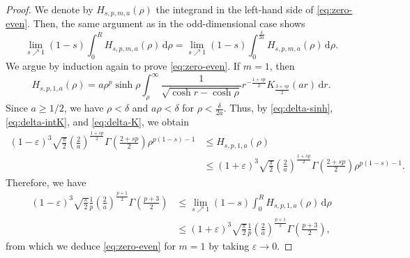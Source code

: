 \documentclass[11pt]{amsart}
\theoremstyle{plain}
\theoremstyle{definition}
\numberwithin{equation}{section}
\begin{document}
\begin{proof}
We denote by $H_{s, p, m, a}(\rho)$ the integrand in the left-hand side of \eqref{eq:zero-even}. Then, the same argument as in the odd-dimensional case shows
\begin{equation*}
\lim_{s \nearrow 1} (1-s) \int_{0}^{R} H_{s, p, m, a}(\rho) \, \mathrm{d}\rho = \lim_{s \nearrow 1} (1-s) \int_{0}^{\frac{\delta}{2a}} H_{s, p, m, a}(\rho) \, \mathrm{d}\rho.
\end{equation*}
We argue by induction again to prove \eqref{eq:zero-even}. If $m=1$, then
\begin{equation*}
H_{s, p, 1, a}(\rho) = a \rho^{p} \sinh\rho \int_{\rho}^{\infty} \frac{1}{\sqrt{\cosh r - \cosh \rho}} r^{-\frac{1+sp}{2}} K_{\frac{3+sp}{2}}(ar) \, \mathrm{d}r.
\end{equation*}
Since $a \geq 1/2$, we have $\rho < \delta$ and $a\rho < \delta$ for $\rho < \frac{\delta}{2a}$. Thus, by \eqref{eq:delta-sinh}, \eqref{eq:delta-intK}, and \eqref{eq:delta-K}, we obtain
\begin{equation*}
\begin{split}
(1-\varepsilon)^{3} \sqrt{\frac{\pi}{2}} \left( \frac{2}{a} \right)^{\frac{1+sp}{2}} \Gamma\left( \frac{2+sp}{2} \right) \rho^{p(1-s)-1}
&\leq H_{s, p, 1, a}(\rho) \\
&\leq (1+\varepsilon)^{3} \sqrt{\frac{\pi}{2}} \left( \frac{2}{a} \right)^{\frac{1+sp}{2}} \Gamma\left( \frac{2+sp}{2} \right) \rho^{p(1-s)-1}.
\end{split}
\end{equation*}
Therefore, we have
\begin{equation*}
\begin{split}
(1-\varepsilon)^{3} \sqrt{\frac{\pi}{2}} \frac{1}{p} \left( \frac{2}{a} \right)^{\frac{p+1}{2}} \Gamma\left( \frac{p+3}{2} \right)
&\leq \lim_{s \nearrow 1} (1-s) \int_{0}^{R} H_{s, p, 1, a}(\rho) \, \mathrm{d}\rho \\
&\leq (1+\varepsilon)^{3} \sqrt{\frac{\pi}{2}} \frac{1}{p} \left( \frac{2}{a} \right)^{\frac{p+1}{2}} \Gamma\left( \frac{p+3}{2} \right),
\end{split}
\end{equation*}
from which we deduce \eqref{eq:zero-even} for $m=1$ by taking $\varepsilon \to 0$.


\end{proof}
\end{document}
